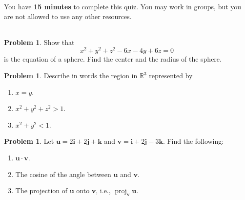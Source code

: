 \documentclass[12pt]{article}
\theoremstyle{plain}
\theoremstyle{definition}
\newtheorem{problem}[exercise]{Problem}
\theoremstyle{remark}
\DeclareMathOperator{\proj}{proj}
\newcommand{\bbR}{\mathbb{R}}
\newcommand{\bfu}{\mathbf{u}}
\newcommand{\bfv}{\mathbf{v}}
\begin{document}
\author{TA: \href{mailto:\authoremail}{\documentauthor}}
\title{\documenttitle}
\date{\today}
\maketitle

You have \textbf{15 minutes} to complete this quiz. You may work in groups,
but you are not allowed to use any other resources.
\\\\
\begin{problem}
Show that
\[
x^2+y^2+z^2-6x-4y+6z=0
\]
is the equation of a sphere. Find the center and the radius of the sphere.
\end{problem}
\bigskip
\begin{problem}
Describe in words the region in $\bbR^3$ represented by
\begin{enumerate}[label=(\alph*)]
\item $x=y$.
\item $x^2+y^2+z^2>1$.
\item $x^2+y^2<1$.
\end{enumerate}
\end{problem}
\bigskip
\begin{problem}
Let $\bfu=2\mathbf{i}+2\mathbf{j}+\mathbf{k}$ and
$\bfv=\mathbf{i}+2\mathbf{j}-3\mathbf{k}$. Find the following:
\begin{enumerate}[label=(\alph*)]
\item $\bfu\cdot\bfv$.
\item The cosine of the angle between $\bfu$ and $\bfv$.
\item The projection of $\bfu$ onto $\bfv$, i.e.,
  $\proj_{\bfv}\bfu$.
\end{enumerate}
\end{problem}
\end{document}
